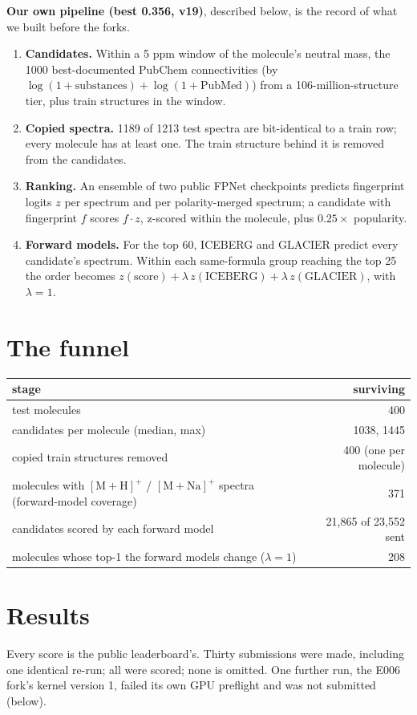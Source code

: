\documentclass[11pt]{article}
\begin{document}
\textbf{Our own pipeline (best 0.356, v19)}, described below, is the record of what we built before the forks.
\begin{enumerate}
  \item \textbf{Candidates.} Within a 5 ppm window of the molecule's neutral mass, the 1000
    best-documented PubChem connectivities (by $\log(1+\text{substances}) + \log(1+\text{PubMed})$)
    from a 106-million-structure tier, plus train structures in the window.
  \item \textbf{Copied spectra.} 1189 of 1213 test spectra are bit-identical to a train row; every
    molecule has at least one. The train structure behind it is removed from the candidates.
  \item \textbf{Ranking.} An ensemble of two public FPNet checkpoints predicts fingerprint logits
    $z$ per spectrum and per polarity-merged spectrum; a candidate with fingerprint $f$ scores
    $f\cdot z$, z-scored within the molecule, plus $0.25 \times$ popularity.
  \item \textbf{Forward models.} For the top 60, ICEBERG and GLACIER predict every candidate's
    spectrum. Within each same-formula group reaching the top 25 the order becomes
    $z(\text{score}) + \lambda\, z(\text{ICEBERG}) + \lambda\, z(\text{GLACIER})$, with $\lambda = 1$.
\end{enumerate}

\section{The funnel}
\begin{center}
\begin{tabular}{lr}
\toprule
stage & surviving \\
\midrule
test molecules & 400 \\
candidates per molecule (median, max) & 1038, 1445 \\
copied train structures removed & 400 (one per molecule) \\
molecules with $[\mathrm{M{+}H}]^+$ / $[\mathrm{M{+}Na}]^+$ spectra (forward-model coverage) & 371 \\
candidates scored by each forward model & 21{,}865 of 23{,}552 sent \\
molecules whose top-1 the forward models change ($\lambda=1$) & 208 \\
\bottomrule
\end{tabular}
\end{center}

\section{Results}
Every score is the public leaderboard's. Thirty submissions were made, including one identical
re-run; all were scored; none is omitted. One further run, the E006 fork's kernel version 1, failed its
own GPU preflight and was not submitted (below).
\end{document}
